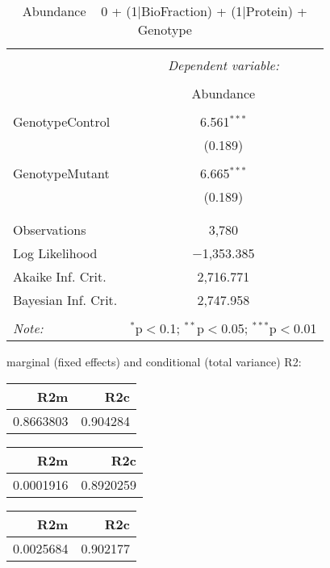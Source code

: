 \documentclass[11pt]{report}
\begin{document}
\begin{table}[!htbp] \centering 
  \caption{Abundance ~ 0 + (1|BioFraction) + (1|Protein) + Genotype} 
  \label{} 
\begin{tabular}{@{\extracolsep{5pt}}lc} 
\\[-1.8ex]\hline 
\hline \\[-1.8ex] 
 & \multicolumn{1}{c}{\textit{Dependent variable:}} \\ 
\cline{2-2} 
\\[-1.8ex] & Abundance \\ 
\hline \\[-1.8ex] 
 GenotypeControl & 6.561$^{***}$ \\ 
  & (0.189) \\ 
  & \\ 
 GenotypeMutant & 6.665$^{***}$ \\ 
  & (0.189) \\ 
  & \\ 
\hline \\[-1.8ex] 
Observations & 3,780 \\ 
Log Likelihood & $-$1,353.385 \\ 
Akaike Inf. Crit. & 2,716.771 \\ 
Bayesian Inf. Crit. & 2,747.958 \\ 
\hline 
\hline \\[-1.8ex] 
\textit{Note:}  & \multicolumn{1}{r}{$^{*}$p$<$0.1; $^{**}$p$<$0.05; $^{***}$p$<$0.01} \\ 
\end{tabular} 
\end{table} 
marginal (fixed effects) and conditional (total variance) R2:

\begin{tabular}{r|r}
\hline
R2m & R2c\\
\hline
0.8663803 & 0.904284\\
\hline
\end{tabular}

\begin{tabular}{r|r}
\hline
R2m & R2c\\
\hline
0.0001916 & 0.8920259\\
\hline
\end{tabular}

\begin{tabular}{r|r}
\hline
R2m & R2c\\
\hline
0.0025684 & 0.902177\\
\hline
\end{tabular}
\end{document}
